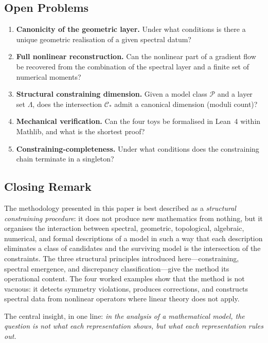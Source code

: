 \documentclass[11pt,a4paper]{article}
\theoremstyle{definition}
\theoremstyle{plain}
\newcommand{\Lam}{\Lambda}
\newcommand{\Ccal}{\mathcal{C}}
\begin{document}
\subsection{Open Problems}

\begin{enumerate}[label=(\arabic*)]
  \item \textbf{Canonicity of the geometric layer.} Under what
        conditions is there a unique geometric realisation of a
        given spectral datum?
  \item \textbf{Full nonlinear reconstruction.} Can the nonlinear
        part of a gradient flow be recovered from the combination
        of the spectral layer and a finite set of numerical
        moments?
  \item \textbf{Structural constraining dimension.} Given a model
        class $\mathcal P$ and a layer set $\Lam$, does the
        intersection $\Ccal_\ast$ admit a canonical dimension
        (moduli count)?
  \item \textbf{Mechanical verification.} Can the four toys be
        formalised in Lean~4 within Mathlib, and what is the
        shortest proof?
  \item \textbf{Constraining-completeness.} Under what conditions
        does the constraining chain terminate in a singleton?
\end{enumerate}

\subsection{Closing Remark}

The methodology presented in this paper is best described as a
\emph{structural constraining procedure}: it does not produce new
mathematics from nothing, but it organises the interaction between
spectral, geometric, topological, algebraic, numerical, and formal
descriptions of a model in such a way that each description
eliminates a class of candidates and the surviving model is the
intersection of the constraints. The three structural principles
introduced here---constraining, spectral emergence, and discrepancy
classification---give the method its operational content. The four
worked examples show that the method is not vacuous: it detects
symmetry violations, produces corrections, and constructs spectral
data from nonlinear operators where linear theory does not apply.

The central insight, in one line: \emph{in the analysis of a
mathematical model, the question is not what each representation
\emph{shows}, but what each representation \emph{rules out}.}
\end{document}
